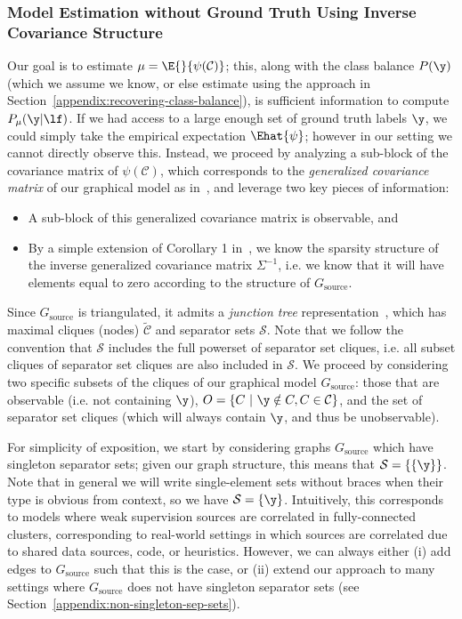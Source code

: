\documentclass[letterpaper]{article}
\begin{document}
\begin{appendix}
\subsubsection{Model Estimation without Ground Truth Using Inverse Covariance Structure}
\label{appendix:model-estimation}
Our goal is to estimate $\mu = \E{}{ \psi(\mathcal{C}) }$; this, along with the class balance $P(\y)$ (which we assume we know, or else estimate using the approach in Section~\ref{appendix:recovering-class-balance}), is sufficient information to compute $P_\mu(\y|\lf)$.
If we had access to a large enough set of ground truth labels $\y$, we could simply take the empirical expectation $\Ehat{ \psi }$; however in our setting we cannot directly observe this.
Instead, we proceed by analyzing a sub-block of the covariance matrix of $\psi(\mathcal{C})$, which corresponds to the \textit{generalized covariance matrix} of our graphical model as in~\cite{loh2012structure}, and leverage two key pieces of information:
\begin{itemize}
	\item A sub-block of this generalized covariance matrix is observable, and
\item By a simple extension of Corollary 1 in~\cite{loh2012structure}, we know the sparsity structure of the inverse generalized covariance matrix $\Sigma^{-1}$, i.e. we know that it will have elements equal to zero according to the structure of $G_{\text{source}}$.
\end{itemize}
Since $G_{\text{source}}$ is triangulated, it admits a \textit{junction tree} representation~\cite{koller2009probabilistic}, which has maximal cliques (nodes) $\tilde{\mathcal{C}}$ and separator sets $\mathcal{S}$.
Note that we follow the convention that $\mathcal{S}$ includes the full powerset of separator set cliques, i.e. all subset cliques of separator set cliques are also included in $\mathcal{S}$.
We proceed by considering two specific subsets of the cliques of our graphical model $G_{\text{source}}$: those that are observable (i.e. not containing $\y$), $O = \{ C ~|~ \y \notin C, C \in \mathcal{C} \}$, and the set of separator set cliques (which will always contain $\y$, and thus be unobservable).

For simplicity of exposition, we start by considering graphs $G_{\text{source}}$ which have singleton separator sets; given our graph structure, this means that $\mathcal{S} = \{\{\y\}\}$.
Note that in general we will write single-element sets without braces when their type is obvious from context, so we have $\mathcal{S} = \{\y\}$.
Intuitively, this corresponds to models where weak supervision sources are correlated in fully-connected clusters, corresponding to real-world settings in which sources are correlated due to shared data sources, code, or heuristics.
However, we can always either (i) add edges to $G_{\text{source}}$ such that this is the case, or (ii) extend our approach to many settings where $G_{\text{source}}$ does not have singleton separator sets (see Section~\ref{appendix:non-singleton-sep-sets}).


\end{appendix}
\end{document}
